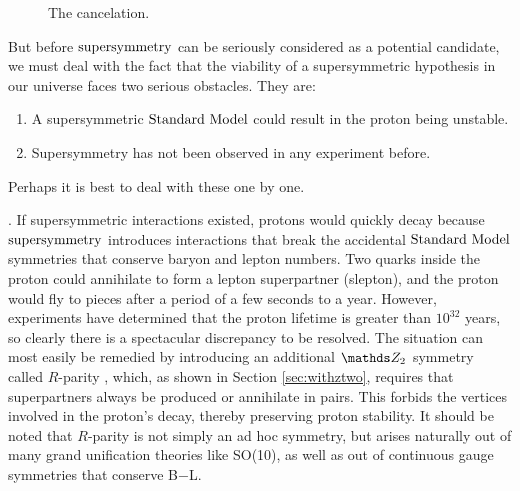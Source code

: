 \begin{figure}[h]
\caption{The cancelation.} 
\label{fig:SusyCancelations}
\end{figure}

But before $\text{supersymmetry}$ can be seriously considered as a potential candidate, we must deal with the fact that the viability of a supersymmetric hypothesis in our universe faces two serious obstacles. They are:
\begin{enumerate}
\item{A supersymmetric $\text{Standard\ Model}$ could result in the proton being unstable.}
\item{Supersymmetry has not been observed in any experiment before.}
\end{enumerate}
Perhaps it is best to deal with these one by one.

. If supersymmetric interactions existed, protons would quickly decay because $\text{supersymmetry}$ introduces interactions that break the accidental $\text{Standard\ Model}$ symmetries that conserve baryon and lepton numbers. Two quarks inside the proton could annihilate to form a lepton superpartner (slepton), and the proton would fly to pieces after a period of a few seconds to a year. However, experiments \cite{Miura:2009yma} have determined that the proton lifetime is greater than $10^{32}$ years, so clearly there is a spectacular discrepancy to be resolved. The situation can most easily be remedied by introducing an additional $\ztwo$ symmetry called $R$-parity \cite{Farrar:1982te}, which, as shown in Section \ref{sec:withztwo}, requires that superpartners always be produced or annihilate in pairs. This forbids the vertices involved in the proton's decay, thereby preserving proton stability. It should be noted that $R$-parity is not simply an ad hoc symmetry, but arises naturally out of many grand unification theories like SO(10), as well as out of continuous gauge symmetries that conserve B$-$L.

